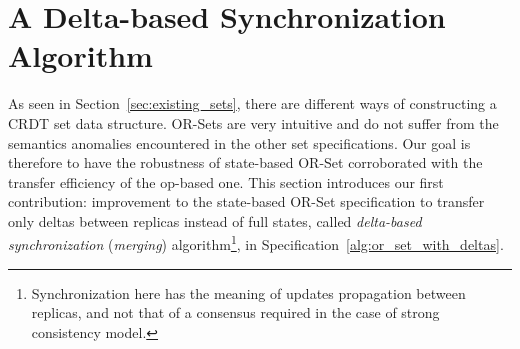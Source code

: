 \section{A Delta-based Synchronization Algorithm}
\label{sec:delta_sync}

As seen in Section~\ref{sec:existing_sets}, there are different ways of
constructing a CRDT set data structure.  OR-Sets are very intuitive and do not
suffer from the semantics anomalies encountered in the other set specifications.
Our goal is therefore to have the robustness of state-based OR-Set corroborated
with the transfer efficiency of the op-based one. This section introduces our
first contribution: improvement to the state-based OR-Set specification to
transfer only deltas between replicas instead of full states, called
\textit{delta-based synchronization} (\textit{merging})
algorithm\footnote{Synchronization here has the meaning of updates propagation
between replicas, and not that of a consensus required in the case of strong
consistency model.}, in Specification~\ref{alg:or_set_with_deltas}.

